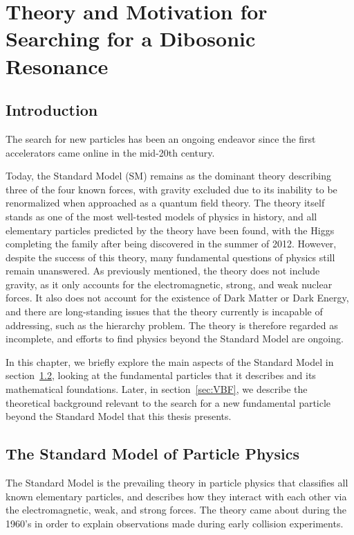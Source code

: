 
\chapter{Theory and Motivation for Searching for a Dibosonic Resonance}
\label{chap:theory}

\section{Introduction}

The search for new particles has been an ongoing endeavor since the first accelerators came online in the mid-20th century.

Today, the Standard Model (SM) remains as the dominant theory describing three of the four known forces, with gravity excluded due to its inability to be renormalized when approached as a quantum field theory.
The theory itself stands as one of the most well-tested models of physics in history, and all elementary particles predicted by the theory have been found, with the Higgs completing the family after being discovered in the summer of 2012.
However, despite the success of this theory, many fundamental questions of physics still remain unanswered.
As previously mentioned, the theory does not include gravity, as it only accounts for the electromagnetic, strong, and weak nuclear forces.
It also does not account for the existence of Dark Matter or Dark Energy, and there are long-standing issues that the theory currently is incapable of addressing, such as the hierarchy problem.
The theory is therefore regarded as incomplete, and efforts to find physics beyond the Standard Model are ongoing.

In this chapter, we briefly explore the main aspects of the Standard Model in section~\ref{sec:SM}, looking at the fundamental particles that it describes and its mathematical foundations.
Later, in section~\ref{sec:VBF}, we describe the theoretical background relevant to the search for a new fundamental particle beyond the Standard Model that this thesis presents.

\section{The Standard Model of Particle Physics}
\label{sec:SM}

The Standard Model is the prevailing theory in particle physics that classifies all known elementary particles, and describes how they interact with each other via the electromagnetic, weak, and strong forces.
The theory came about during the 1960's in order to explain observations made during early collision experiments\footnotemark.

